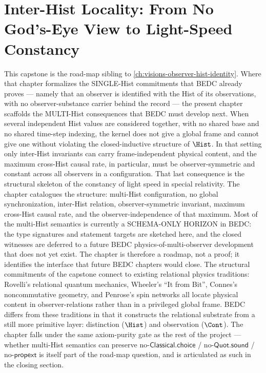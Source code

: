 \chapter{Inter-Hist Locality: From No God's-Eye View to Light-Speed Constancy}
\label{ch:visions-inter-hist-locality}

This capstone is the road-map sibling to \autoref{ch:visions-observer-hist-identity}. Where that chapter formalizes the SINGLE-Hist commitments that BEDC already proves --- namely that an observer is identified with the Hist of its observations, with no observer-substance carrier behind the record --- the present chapter scaffolds the MULTI-Hist consequences that BEDC must develop next. When several independent Hist values are considered together, with no shared base and no shared time-step indexing, the kernel does not give a global frame and cannot give one without violating the closed-inductive structure of \(\Hist\). In that setting only inter-Hist invariants can carry frame-independent physical content, and the maximum cross-Hist causal rate, in particular, must be observer-symmetric and constant across all observers in a configuration. That last consequence is the structural skeleton of the constancy of light speed in special relativity. The chapter catalogues the structure: multi-Hist configuration, no global synchronization, inter-Hist relation, observer-symmetric invariant, maximum cross-Hist causal rate, and the observer-independence of that maximum. Most of the multi-Hist semantics is currently a SCHEMA-ONLY HORIZON in BEDC: the type signatures and statement targets are sketched here, and the closed witnesses are deferred to a future BEDC physics-of-multi-observer development that does not yet exist. The chapter is therefore a roadmap, not a proof; it identifies the interface that future BEDC chapters would close. The structural commitments of the capstone connect to existing relational physics traditions: Rovelli's relational quantum mechanics, Wheeler's ``It from Bit'', Connes's noncommutative geometry, and Penrose's spin networks all locate physical content in observer-relations rather than in a privileged global frame. BEDC differs from these traditions in that it constructs the relational substrate from a still more primitive layer: distinction (\(\Hist\)) and observation (\(\Cont\)). The chapter falls under the same axiom-purity gate as the rest of the project --- whether multi-Hist semantics can preserve no-\(\mathsf{Classical.choice}\) / no-\(\mathsf{Quot.sound}\) / no-\(\mathsf{propext}\) is itself part of the road-map question, and is articulated as such in the closing section.

